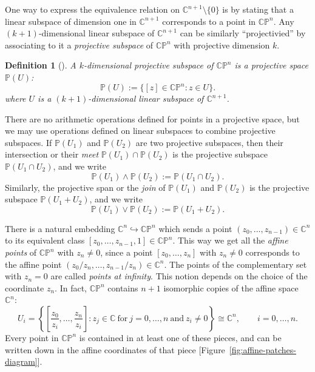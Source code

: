 \documentclass[12pt,a4paper]{article}
\theoremstyle{BoldTopSpacing}
\theoremstyle{BoldTopSpacing}
\theoremstyle{BoldTopSpacing}
\theoremstyle{BoldTopBottomSpacing}
\newtheorem{definition}{Definition}[section]
\theoremstyle{BoldTopSpacing}
\theoremstyle{BoldTopBottomSpacing}
\theoremstyle{remark}
\begin{document}
One way to express the equivalence relation on $\mathbb{C}^{n+1} \setminus \{ 0 \}$ is by stating that a linear subspace of dimension one in $\mathbb{C}^{n + 1}$ corresponds to a point in $\mathbb{C}\mathbb{P}^n$. Any $(k+1)$-dimensional linear subspace of $\mathbb{C}^{n + 1}$ can be similarly \enquote{projectivied} by associating to it a \textit{projective subspace} of $\mathbb{C}\mathbb{P}^n$ with projective dimension $k$.

\begin{definition}[]
\label{def:projective-subspace}
A $k$-dimensional projective subspace of $\mathbb{C}\mathbb{P}^n$ is a projective space $\mathbb{P}(U)$:
   \[
       \mathbb{P}(U) := \{ [z] \in \mathbb{C}\mathbb{P}^n : z \in U \}.
   \]
where $U$ is a $(k+1)$-dimensional linear subspace of $\mathbb{C}^{n+1}$.
\end{definition}

There are no arithmetic operations defined for points in a projective space, but we may use operations defined on linear subspaces to combine projective subspaces. \newline
If $\mathbb{P}(U_{1})$ and $\mathbb{P}(U_{2})$ are two projective subspaces, then their intersection or their \textit{meet }$ \mathbb{P}(U_{1}) \cap \mathbb{P}(U_{2})$ is the projective subspace $\mathbb{P}(U_{1} \cap U_{2})$, and we write
\[
\mathbb{P}(U_{1}) \wedge \mathbb{P}(U_{2}) := \mathbb{P}(U_{1} \cap U_{2}).
\]
Similarly, the projective span or the \textit{join} of $\mathbb{P}(U_{1})$ and $\mathbb{P}(U_{2})$ is the projective subspace $\mathbb{P}(U_{1} + U_{2})$, and we write
\[
\mathbb{P}(U_{1}) \vee \mathbb{P}(U_{2}) := \mathbb{P}(U_{1} + U_{2}).
\]

There is a natural embedding $\mathbb{C}^n \hookrightarrow \mathbb{C}\mathbb{P}^n$ which sends a point $(z_{0}, \dots, z_{n-1}) \in \mathbb{C}^n$ to its equivalent class $[z_{0},\dots, z_{n-1}, 1] \in \mathbb{C}\mathbb{P}^n$. This way we get all the \textit{affine points} of $\mathbb{C}\mathbb{P}^n$ with $z_{n} \neq 0$, since a point $[z_{0}, \dots, z_{n}]$ with $z_{n} \neq 0$ corresponds to the affine point $(z_{0}/z_{n}, \dots, z_{n-1}/z_{n}) \in \mathbb{C}^{n}$. The points of the complementary set with $z_{n} = 0$ are called \textit{points at infinity}. This notion depends on the choice of the coordinate $z_{n}$. In fact, $\mathbb{C}\mathbb{P}^n$ contains $n + 1$ isomorphic copies of the affine space $\mathbb{C}^n$:
\[
    U_{i} = \left\{ \left[ \frac{z_{0}}{z_{i}}, \dots, \frac{z_{n}}{z_{i}} \right] : z_{j} \in \mathbb{C} \ \text{for} \ j=0, \dots, n \ \text{and} \ z_{i} \neq 0 \right\} \cong \mathbb{C}^n, \quad \quad i=0, \dots, n.
\]
Every point in $\mathbb{C}\mathbb{P}^n$ is contained in at least one of these pieces, and can be written down in the affine coordinates of that piece [Figure~\ref{fig:affine-patches-diagram}].\par
\end{document}
